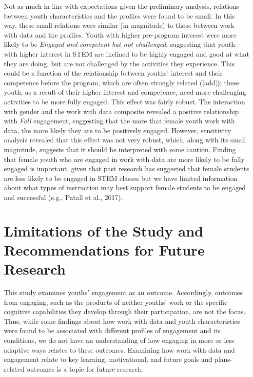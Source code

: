 \documentclass[]{msu-thesis}
\theoremstyle{definition}
\theoremstyle{definition}
\theoremstyle{definition}
\theoremstyle{remark}
\begin{document}
Not as much in line with expectations given the preliminary analysis,
relations between youth characteristics and the profiles were found to
be small. In this way, these small relations were similar (in magnitude)
to those between work with data and the profiles. Youth with higher
pre-program interest were more likely to be \emph{Engaged and competent
but not challenged}, suggesting that youth with higher interest in STEM
are inclined to be highly engaged and good at what they are doing, but
are not challenged by the activities they experience. This could be a
function of the relationship between youths' interest and their
competence before the program, which are often strongly related
({[}add{]}); these youth, as a result of their higher interest and
competence, need more challenging activities to be more fully engaged.
This effect was fairly robust. The interaction with gender and the work
with data composite revealed a positive relationship with \emph{Full}
engagement, suggesting that the more that female youth work with data,
the more likely they are to be positively engaged. However, sensitivity
analysis revealed that this effect was not very robust, which, along
with its small magnitude, suggests that it should be interpreted with
some caution. Finding that female youth who are engaged in work with
data are more likely to be fully engaged is important, given that past
research has suggested that female students are less likely to be
engaged in STEM classes but we have limited information about what types
of instruction may best support female students to be engaged and
successful (e.g., Patall et al., 2017).

\section{Limitations of the Study and Recommendations for Future
Research}\label{limitations-of-the-study-and-recommendations-for-future-research}

This study examines youths' engagement as an outcome. Accordingly,
outcomes from engaging, such as the products of neither youths' work or
the specific cognitive capabilities they develop through their
participation, are not the focus. Thus, while some findings about how
work with data and youth characteristics were found to be associated
with different profiles of engagement and its conditions, we do not have
an understanding of how engaging in more or less adaptive ways relates
to these outcomes. Examining how work with data and engagement relate to
key learning, motivational, and future goals and plans-related outcomes
is a topic for future research.
\end{document}
